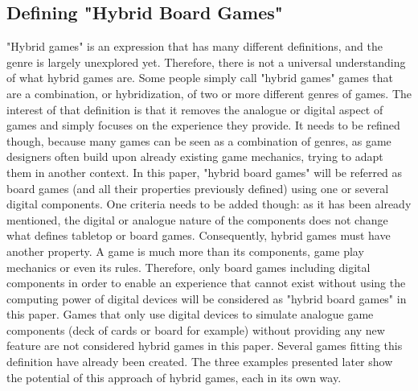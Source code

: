 \subsection{Defining "Hybrid Board Games"}
"Hybrid games" is an expression that has many different definitions, and the genre is largely unexplored yet. Therefore, there is not a universal understanding of what hybrid games are. Some people simply call "hybrid games" games that are a combination, or hybridization, of two or more different genres of games. The interest of that definition is that it removes the analogue or digital aspect of games and simply focuses on the experience they provide. It needs to be refined though, because many games can be seen as a combination of genres, as game designers often build upon already existing game mechanics, trying to adapt them in another context. In this paper, "hybrid board games" will be referred as board games (and all their properties previously defined) using one or several digital components. One criteria needs to be added though: as it has been already mentioned, the digital or analogue nature of the components does not change  what defines tabletop or board games. Consequently, hybrid games must have another property. A game is much more than its components, game play mechanics or even its rules. Therefore, only board games including digital components in order to enable an experience that cannot exist without using the computing power of digital devices will be considered as "hybrid board games" in this paper. Games that only use digital devices to simulate analogue game components (deck of cards or board for example) without providing any new feature are not considered hybrid games in this paper. Several games fitting this definition have already been created. The three examples presented later show the potential of this approach of hybrid games, each in its own way.
